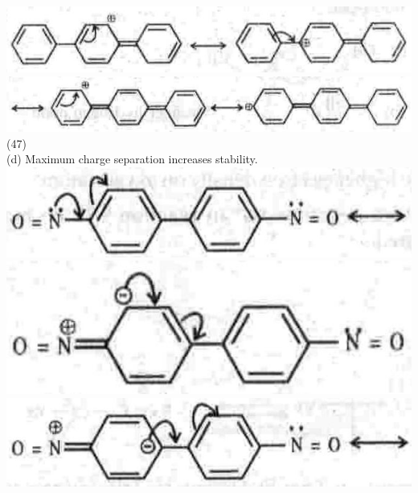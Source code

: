 \documentclass[10pt]{article}
\begin{document}
\includegraphics[max width=\textwidth, center]{2025_01_28_8470952b98110cec3aabg-166(3)}\\
\includegraphics[max width=\textwidth, center]{2025_01_28_8470952b98110cec3aabg-166(1)}\\
(47)\\
(d) Maximum charge separation increases stability.\\
\includegraphics[max width=\textwidth, center]{2025_01_28_8470952b98110cec3aabg-166}\\
\includegraphics[max width=\textwidth, center]{2025_01_28_8470952b98110cec3aabg-166(2)}\\
\includegraphics[max width=\textwidth, center]{2025_01_28_8470952b98110cec3aabg-166(4)}
\end{document}

